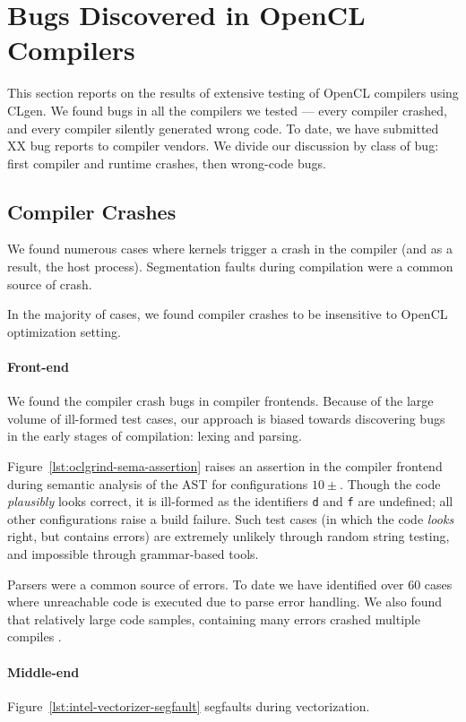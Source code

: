 \section{Bugs Discovered in OpenCL Compilers}

This section reports on the results of extensive testing of OpenCL compilers using CLgen. We found bugs in all the compilers we tested --- every compiler crashed, and every compiler silently generated wrong code. To date, we have submitted XX bug reports to compiler vendors. We divide our discussion by class of bug: first compiler and runtime crashes, then wrong-code bugs.

\subsection{Compiler Crashes}

We found numerous cases where kernels trigger a crash in the compiler (and as a result, the host process). Segmentation faults during compilation were a common source of crash.

In the majority of cases, we found compiler crashes to be insensitive to OpenCL optimization setting.


\paragraph{Front-end} We found the compiler crash bugs in compiler frontends. Because of the large volume of ill-formed test cases, our approach is biased towards discovering bugs in the early stages of compilation: lexing and parsing.

Figure~\ref{lst:oclgrind-sema-assertion} raises an assertion in the compiler frontend during semantic analysis of the AST for configurations $10\pm$. Though the code \emph{plausibly} looks correct, it is ill-formed as the identifiers \texttt{d} and \texttt{f} are undefined; all other configurations raise a build failure. Such test cases (in which the code \emph{looks} right, but contains errors) are extremely unlikely through random string testing, and impossible through grammar-based tools.

Parsers were a common source of errors. To date we have identified over 60 cases where unreachable code is executed due to parse error handling. We also found that relatively large code samples, containing many errors crashed multiple compiles .

\paragraph{Middle-end} Figure~\ref{lst:intel-vectorizer-segfault} segfaults during vectorization.

